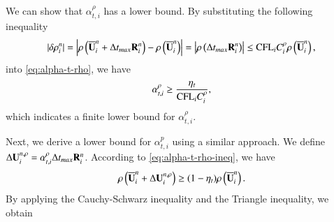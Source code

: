 We can show that $\alpha_{t,i}^{\rho}$ has a lower bound.
By substituting the following inequality 
\begin{equation}
    |\delta \rho_i^n| = \left|\rho\left(\overline{\mathbf{U}}^n_i + \mathrm\Delta t_{max} \mathbf{R}^n_i\right) - \rho\left(\overline{\mathbf{U}}^n_i\right)\right|
    =
    \left|\rho\left(\mathrm\Delta t_{max} \mathbf{R}^n_i\right)\right|
    \leq
    \text{CFL}_i C^\rho_i \rho\left(\overline{\mathbf{U}}^n_i\right),
\end{equation}
into \eqref{eq:alpha-t-rho}, we have
\begin{equation}
    \label{eq:alpha-t-rho-lb}
    \alpha_{t,i}^{\rho} \geq \frac{\eta_t}{\text{CFL}_i C_i^\rho},
\end{equation}
which indicates a finite lower bound for $\alpha_{t,i}^{\rho}$. 

\newcommand{\uincT}{\inc\U_i^{n,\rho}}
Next, we derive a lower bound for $\alpha_{t,i}^{p}$ using a similar approach.
We define $\mathrm\Delta\mathbf{U}_i^{n,\rho} =\alpha_{t,i}^{\rho} \mathrm\Delta t_{max} \mathbf{R}^n_i$.
According to \eqref{eq:alpha-t-rho-ineq}, we have 
\begin{equation}
    \rho\left(\UM^n_i+\uincT  \right) \geq (1-\eta_t)\rho\left(\UM^n_i\right).
\end{equation}
By applying the Cauchy-Schwarz inequality and the Triangle inequality, we obtain
